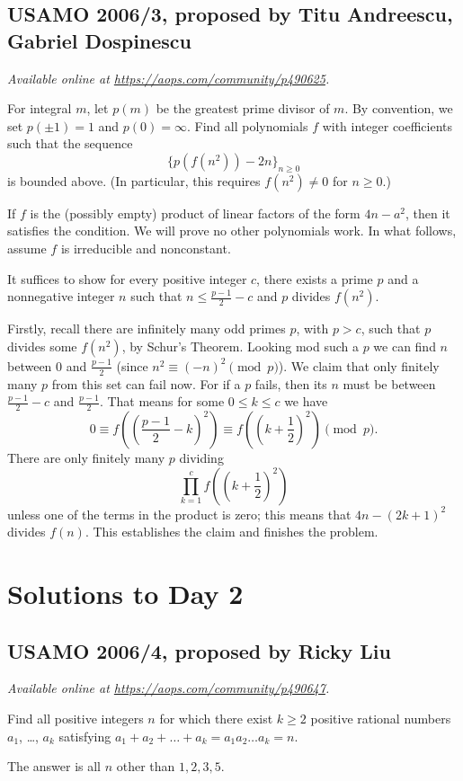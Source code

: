 \documentclass[11pt]{scrartcl}
\begin{document}
\subsection{USAMO 2006/3, proposed by Titu Andreescu, Gabriel Dospinescu}
\textsl{Available online at \url{https://aops.com/community/p490625}.}
\begin{mdframed}[style=mdpurplebox,frametitle={Problem statement}]
For integral $m$, let $p(m)$ be the greatest prime divisor of $m$.
By convention, we set $p(\pm 1) = 1$ and $p(0) = \infty$.
Find all polynomials $f$ with integer coefficients
such that the sequence
\[ \{ p(f(n^2)) - 2n \}_{n \geq 0}  \]
is bounded above.
(In particular, this requires $f(n^2) \neq 0$ for $n \ge 0$.)
\end{mdframed}
If $f$ is the (possibly empty)
product of linear factors of the form $4n-a^2$,
then it satisfies the condition.
We will prove no other polynomials work.
In what follows, assume $f$ is irreducible and nonconstant.

It suffices to show for every positive integer $c$,
there exists a prime $p$ and a nonnegative integer $n$
such that $n \le \tfrac{p-1}{2} - c$ and $p$ divides $f(n^2)$.

Firstly, recall there are infinitely many odd primes $p$,
with $p>c$, such that $p$ divides some $f(n^2)$, by Schur's Theorem.
Looking mod such a $p$ we can find $n$ between $0$
and $\tfrac{p-1}{2}$ (since $n^2 \equiv (-n)^2 \pmod p$).
We claim that only finitely many $p$ from this set can fail now.
For if a $p$ fails, then its $n$ must be between
$\tfrac{p-1}{2} - c$ and $\tfrac{p-1}{2}$.
That means for some $0 \le k \le c$ we have
\[ 0 \equiv f\left( \left(\frac{p-1}{2}-k\right)^2 \right)
  \equiv f\left( \left( k + \frac12 \right)^2 \right) \pmod{p}. \]
There are only finitely many $p$ dividing
\[ \prod_{k=1}^c f\left( \left( k+\frac12 \right)^2 \right) \]
unless one of the terms in the product is zero;
this means that $4n-(2k+1)^2$ divides $f(n)$.
This establishes the claim and finishes the problem.
\pagebreak

\section{Solutions to Day 2}
\subsection{USAMO 2006/4, proposed by Ricky Liu}
\textsl{Available online at \url{https://aops.com/community/p490647}.}
\begin{mdframed}[style=mdpurplebox,frametitle={Problem statement}]
Find all positive integers $n$ for
which there exist $k \ge 2$ positive rational
numbers $a_1$, \dots, $a_k$ satisfying
$a_1 + a_2 + \dots + a_k = a_1 a_2 \dots a_k = n$.
\end{mdframed}
The answer is all $n$ other than $1,2,3,5$.
\end{document}

